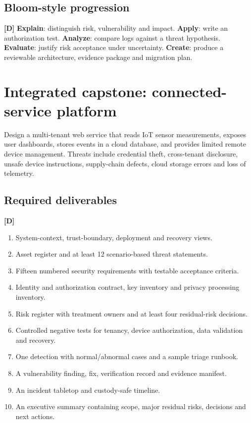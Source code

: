 \documentclass[10pt,letterpaper,oneside]{article}
\newcommand{\designed}{\textsf{\color{accent}\textbf{[D]}}}
\begin{document}
\subsection{Bloom-style progression}\designed{}
\textbf{Explain}: distinguish risk, vulnerability and impact. \textbf{Apply}: write an authorization test. \textbf{Analyze}: compare logs against a threat hypothesis. \textbf{Evaluate}: justify risk acceptance under uncertainty. \textbf{Create}: produce a reviewable architecture, evidence package and migration plan.

\section{Integrated capstone: connected-service platform}
Design a multi-tenant web service that reads IoT sensor measurements, exposes user dashboards, stores events in a cloud database, and provides limited remote device management. Threats include credential theft, cross-tenant disclosure, unsafe device instructions, supply-chain defects, cloud storage errors and loss of telemetry.
\subsection{Required deliverables}\designed{}
\begin{enumerate}
\item System-context, trust-boundary, deployment and recovery views.
\item Asset register and at least 12 scenario-based threat statements.
\item Fifteen numbered security requirements with testable acceptance criteria.
\item Identity and authorization contract, key inventory and privacy processing inventory.
\item Risk register with treatment owners and at least four residual-risk decisions.
\item Controlled negative tests for tenancy, device authorization, data validation and recovery.
\item One detection with normal/abnormal cases and a sample triage runbook.
\item A vulnerability finding, fix, verification record and evidence manifest.
\item An incident tabletop and custody-safe timeline.
\item An executive summary containing scope, major residual risks, decisions and next actions.
\end{enumerate}
\end{document}
